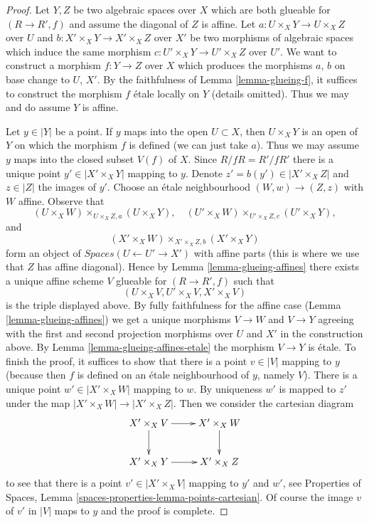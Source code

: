 \documentclass{stacks-project}
\theoremstyle{plain}
\theoremstyle{definition}
\theoremstyle{remark}
\numberwithin{equation}{subsection}
\begin{document}
\begin{proof}
Let $Y, Z$ be two algebraic spaces over $X$ which are both glueable for
$(R \to R', f)$ and assume the diagonal of $Z$ is affine. Let
$a : U \times_X Y \to U \times_X Z$ over $U$ and
$b : X' \times_X Y \to X' \times_X Z$ over $X'$ be two morphisms
of algebraic spaces
which induce the same morphism $c : U' \times_X Y \to U' \times_X Z$
over $U'$.
We want to construct a morphism $f : Y \to Z$ over $X$
which produces the morphisms $a$, $b$ on base change to $U$, $X'$.
By the faithfulness of Lemma \ref{lemma-glueing-f}, it suffices to construct
the morphism $f$ \'etale locally on $Y$ (details omitted).
Thus we may and do assume $Y$ is affine.

\medskip\noindent
Let $y \in |Y|$ be a point. If $y$ maps into the open $U \subset X$,
then $U \times_X Y$ is an open of $Y$ on which the morphism $f$
is defined (we can just take $a$).
Thus we may assume $y$ maps into the closed subset
$V(f)$ of $X$. Since $R/fR = R'/fR'$ there is a unique point
$y' \in |X' \times_X Y|$ mapping to $y$. Denote
$z' = b(y') \in |X' \times_X Z|$ and $z \in |Z|$ the images of $y'$.
Choose an \'etale neighbourhood $(W, w) \to (Z, z)$
with $W$ affine. Observe that
$$
(U \times_X W) \times_{U \times_X Z, a} (U \times_X Y),\quad
(U' \times_X W) \times_{U' \times_X Z, c} (U' \times_X Y),
$$
and
$$
(X' \times_X W) \times_{X' \times_X Z, b} (X' \times_X Y)
$$
form an object of $\textit{Spaces}(U \leftarrow U' \to X')$
with affine parts (this is where we use that $Z$ has affine diagonal).
Hence by Lemma \ref{lemma-glueing-affines}
there exists a unique affine scheme $V$ glueable for $(R \to R', f)$ such that
$$
(U \times_X V, U' \times_X V, X' \times_X V)
$$
is the triple displayed above. By fully faithfulness for the affine
case (Lemma \ref{lemma-glueing-affines}) we get a unique morphisms
$V \to W$ and $V \to Y$ agreeing with the first and second projection
morphisms over $U$ and $X'$ in the construction above.
By Lemma \ref{lemma-glueing-affines-etale} the morphism $V \to Y$ is \'etale.
To finish the proof, it suffices to show that there is a point $v \in |V|$
mapping to $y$ (because then $f$ is defined on an \'etale neighbourhood
of $y$, namely $V$).
There is a unique point $w' \in |X' \times_X W|$ mapping to $w$.
By uniqueness $w'$ is mapped to $z'$ under the map
$|X' \times_X W| \to |X' \times_X Z|$. Then we consider the cartesian
diagram
$$
\xymatrix{
X' \times_X V \ar[r] \ar[d] & X' \times_X W \ar[d] \\
X' \times_X Y \ar[r] & X' \times_X Z
}
$$
to see that there is a point $v' \in |X' \times_X V|$
mapping to $y'$ and $w'$, see
Properties of Spaces, Lemma \ref{spaces-properties-lemma-points-cartesian}.
Of course the image $v$ of $v'$ in $|V|$ maps to $y$ and the proof is complete.
\end{proof}
\end{document}

